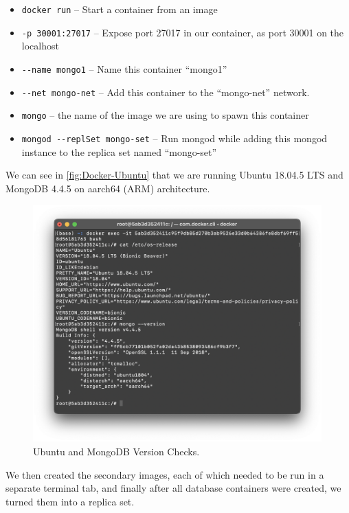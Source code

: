 \documentclass{article}
\begin{document}
\begin{itemize}
    \item \verb|docker run| -- Start a container from an image
    \item \verb|-p 30001:27017| -- Expose port 27017 in our container, as port 30001 on the localhost
    \item \verb|--name mongo1| -- Name this container ``mongo1''
    \item \verb|--net mongo-net| -- Add this container to the ``mongo-net'' network.
    \item \verb|mongo| -- the name of the image we are using to spawn this container
    \item \verb|mongod --replSet mongo-set| -- Run mongod while adding this mongod instance to the replica set named ``mongo-set''
\end{itemize}

\newpage
We can see in \autoref{fig:Docker-Ubuntu} that we are running Ubuntu 18.04.5 LTS and MongoDB 4.4.5 on aarch64 (ARM) architecture.

\begin{figure}[h!]
    \centering
    \includegraphics[width=0.99\textwidth]{Docker-Ubuntu.png}
    \vspace{-3em}\caption{Ubuntu and MongoDB Version Checks.}
    \label{fig:Docker-Ubuntu}
\end{figure}

We then created the secondary images, each of which needed to be run in a separate terminal tab, and finally after all database containers were created, we turned them into a replica set.
\end{document}
